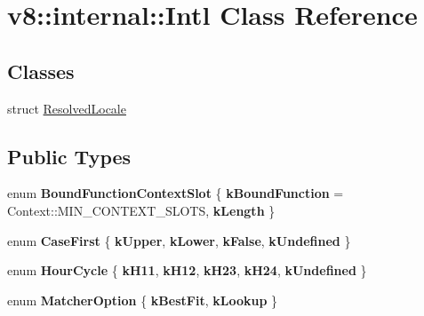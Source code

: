 \hypertarget{classv8_1_1internal_1_1Intl}{}\section{v8\+:\+:internal\+:\+:Intl Class Reference}
\label{classv8_1_1internal_1_1Intl}
\subsection*{Classes}
\begin{DoxyCompactItemize}
\item 
struct \mbox{\hyperlink{structv8_1_1internal_1_1Intl_1_1ResolvedLocale}{Resolved\+Locale}}
\end{DoxyCompactItemize}
\subsection*{Public Types}
\begin{DoxyCompactItemize}
\item 
\mbox{\label{classv8_1_1internal_1_1Intl_ab03f5e63b4ed2f4ab193720b74b74321}} 
enum {\bfseries Bound\+Function\+Context\+Slot} \{ {\bfseries k\+Bound\+Function} = Context\+:\+:M\+I\+N\+\_\+\+C\+O\+N\+T\+E\+X\+T\+\_\+\+S\+L\+O\+TS, 
{\bfseries k\+Length}
 \}
\item 
\mbox{\label{classv8_1_1internal_1_1Intl_a2f0609edfd4c488417bbf0e5ab91e717}} 
enum {\bfseries Case\+First} \{ {\bfseries k\+Upper}, 
{\bfseries k\+Lower}, 
{\bfseries k\+False}, 
{\bfseries k\+Undefined}
 \}
\item 
\mbox{\label{classv8_1_1internal_1_1Intl_adfc4cf2987902ec696cac8a3eb1406b6}} 
enum {\bfseries Hour\+Cycle} \{ \newline
{\bfseries k\+H11}, 
{\bfseries k\+H12}, 
{\bfseries k\+H23}, 
{\bfseries k\+H24}, 
\newline
{\bfseries k\+Undefined}
 \}
\item 
\mbox{\label{classv8_1_1internal_1_1Intl_afb4cf72c66834096fbb2f5c4761d9695}} 
enum {\bfseries Matcher\+Option} \{ {\bfseries k\+Best\+Fit}, 
{\bfseries k\+Lookup}
 \}
\end{DoxyCompactItemize}
